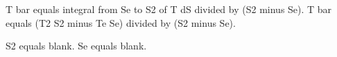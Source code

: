 T bar equals integral from Se to S2 of T dS divided by (S2 minus Se).  
T bar equals (T2 S2 minus Te Se) divided by (S2 minus Se).  

S2 equals blank.  
Se equals blank.